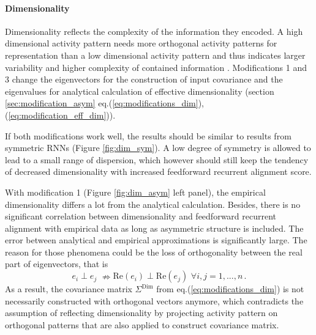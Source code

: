\documentclass[11pt]{article}
\begin{document}
	\paragraph{Dimensionality}
	
	Dimensionality reflects the complexity of the information they encoded. A high dimensional activity pattern needs more orthogonal activity patterns for representation than a low dimensional activity pattern and thus indicates larger variability and higher complexity of contained information \cite{tragenap2023nature, bartolo2020dimensionality, badre2021dimensionality}. Modifications 1 and 3 change the eigenvectors for the construction of input covariance and the eigenvalues for analytical calculation of effective dimensionality (section \ref{sec:modification_asym} eq.(\ref{eq:modifications_dim}), (\ref{eq:modification_eff_dim})). 
	
	If both modifications work well, the results should be similar to results from symmetric RNNs (Figure \ref{fig:dim_sym}). A low degree of symmetry is allowed to lead to a small range of dispersion, which however should still keep the tendency of decreased dimensionality with increased feedforward recurrent alignment score. %
	
	With modification 1 (Figure \ref{fig:dim_asym} left panel), the empirical dimensionality differs a lot from the analytical calculation. Besides, there is no significant correlation between dimensionality and feedforward recurrent alignment with empirical data as long as asymmetric structure is included. The error between analytical and empirical approximations is significantly large. The reason for those phenomena could be the loss of orthogonality between the real part of eigenvectors, that is 
	\begin{equation}
		e_i \perp e_j  \, \, \nRightarrow \text{Re}(e_i) \perp \text{Re}(e_j) \, \, \forall i, j = 1, ..., n \, .
	\end{equation}
	As a result, the covariance matrix $\Sigma^{\text{Dim}}$ from eq.(\ref{eq:modifications_dim}) is not necessarily constructed with orthogonal vectors anymore, which contradicts the assumption of reflecting dimensionality by projecting activity pattern on orthogonal patterns that are also applied to construct covariance matrix. 
	
\end{document}
